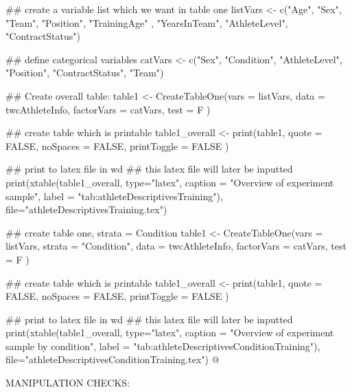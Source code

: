 ## create a variable list which we want in table one
listVars <- c("Age", "Sex", "Team", "Position",  "TrainingAge" , "YearsInTeam", "AthleteLevel", "ContractStatus")

## define categorical variables
catVars <- c("Sex", "Condition", "AthleteLevel", "Position", "ContractStatus", "Team")


## Create overall table:
table1 <- CreateTableOne(vars = listVars,
                         data = twcAthleteInfo,
                         factorVars = catVars,
                         test = F
                         )

## create table which is printable
table1_overall <- print(table1,
                            quote = FALSE,
                            noSpaces = FALSE,
                            printToggle = FALSE
                            )

## print to latex file in wd
## this latex file will later be inputted
print(xtable(table1_overall, type="latex", caption = "Overview of experiment sample",
                    label = "tab:athleteDescriptivesTraining"),
                    file="athleteDescriptivesTraining.tex")

## create table one, strata = Condition
table1 <- CreateTableOne(vars = listVars,
                         strata = "Condition",
                         data = twcAthleteInfo,
                         factorVars = catVars,
                         test = F
                         )

## create table which is printable
table1_overall <- print(table1,
                            quote = FALSE,
                            noSpaces = FALSE,
                            printToggle = FALSE
                            )

## print to latex file in wd
## this latex file will later be inputted
print(xtable(table1_overall, type="latex",
                              caption = "Overview of experiment sample by condition",
                              label = "tab:athleteDescriptivesConditionTraining"),
                              file="athleteDescriptivesConditionTraining.tex")
@




MANIPULATION CHECKS:









